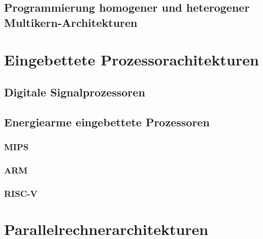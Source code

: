 \documentclass[a4paper,12pt]{scrartcl}
\begin{document}
\subsection{Programmierung homogener und heterogener Multikern-Architekturen}

\newpage
\section{Eingebettete Prozessorachitekturen}
\subsection{Digitale Signalprozessoren}
\subsection{Energiearme eingebettete Prozessoren}
\subsubsection{MIPS}
\subsubsection{ARM}
\subsubsection{RISC-V}

\newpage
\section{Parallelrechnerarchitekturen}
\end{document}

